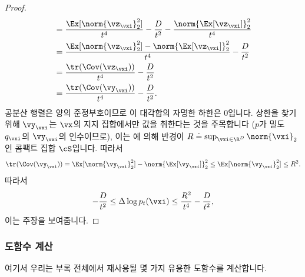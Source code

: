 \documentclass[../../book-main_ko.tex]{subfiles}
\begin{document}
\begin{proof}
\begin{align}
        &= \frac{\Ex[\norm{\vz_{\vxi}}_{2}^{2}]}{t^{4}} - \frac{D}{t^{2}} - \frac{\norm{\Ex[\vz_{\vxi}]}_{2}^{2}}{t^{4}} \\
        &= \frac{\Ex[\norm{\vz_{\vxi}}_{2}^{2}] - \norm{\Ex[\vz_{\vxi}]}_{2}^{2}}{t^{4}} - \frac{D}{t^{2}} \\
        &= \frac{\tr(\Cov(\vz_{\vxi}))}{t^{4}} - \frac{D}{t^{2}} \\
        &= \frac{\tr(\Cov(\vy_{\vxi}))}{t^{4}} - \frac{D}{t^{2}}.
    \end{align}
    공분산 행렬은 양의 준정부호이므로 이 대각합의 자명한 하한은 \(0\)입니다. 상한을 찾기 위해 \(\vy_{\vxi}\)는 \(\vx\)의 지지 집합에서만 값을 취한다는 것을 주목합니다 (\(p\)가 밀도 \(q_{\vxi}\)의 \(\vy_{\vxi}\)의 인수이므로), 이는 에 의해 반경이 \(R \doteq \sup_{\vxi \in \R^{D}}\norm{\vxi}_{2}\)인 콤팩트 집합 \(\cS\)입니다. 따라서
    \begin{equation}
        \tr(\Cov(\vy_{\vxi})) = \Ex[\norm{\vy_{\vxi}}_{2}^{2}] - \norm{\Ex[\vy_{\vxi}]}_{2}^{2} \leq \Ex[\norm{\vy_{\vxi}}_{2}^{2}] \leq R^{2}.
    \end{equation}
    따라서
    \begin{equation}
        -\frac{D}{t^{2}} \leq \Delta \log p_{t}(\vxi) \leq \frac{R^{2}}{t^{4}} - \frac{D}{t^{2}},
    \end{equation}
    이는 주장을 보여줍니다.
\end{proof}

\subsubsection{도함수 계산}

여기서 우리는 부록 전체에서 재사용될 몇 가지 유용한 도함수를 계산합니다.
\end{document}
